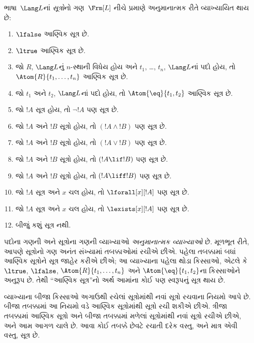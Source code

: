 \begin{defn}[સૂત્રો]
ભાષા~$\Lang L$નાં \emph{સૂત્રો}નો ગણ~$\Frm[L]$ નીચે પ્રમાણે
અનુમાનાત્મક રીતે વ્યાખ્યાયિત થાય છે:
\begin{enumerate}
\item $\lfalse$ આણ્વિક સૂત્ર છે.

\item $\ltrue$ આણ્વિક સૂત્ર છે.

\item જો $R$, $\Lang L$નું $n$-સ્થાની વિધેય હોય અને $t_1$,
  \dots, $t_n$, $\Lang L$નાં પદો હોય, તો
  $\Atom{R}{t_1,\ldots,t_n}$ આણ્વિક સૂત્ર છે.

\item જો $t_1$ અને $t_2$, $\Lang L$નાં પદો હોય, તો
  $\Atom{\eq}{t_1,t_2}$ આણ્વિક સૂત્ર છે.

\item જો $!A$ સૂત્ર હોય, તો $\lnot !A$ પણ
  સૂત્ર છે.

\item જો $!A$ અને $!B$ સૂત્રો હોય, તો $(!A \land
  !B)$ પણ સૂત્ર છે.

\item જો $!A$ અને $!B$ સૂત્રો હોય, તો $(!A \lor !B)$
  પણ સૂત્ર છે.

\item જો $!A$ અને $!B$ સૂત્રો હોય, તો $(!A \lif !B)$
  પણ સૂત્ર છે.

\item જો $!A$ અને $!B$ સૂત્રો હોય, તો $(!A \liff !B)$
  પણ સૂત્ર છે.

\item જો $!A$ સૂત્ર અને $x$ ચલ હોય,
  તો $\lforall[x][!A]$ પણ સૂત્ર છે.

\item જો $!A$ સૂત્ર અને $x$ ચલ હોય,
  તો $\lexists[x][!A]$ પણ સૂત્ર છે.

\item બીજું કશું સૂત્ર નથી.
\end{enumerate}
\end{defn}

\begin{explain}
પદોના ગણની અને સૂત્રોના ગણની વ્યાખ્યાઓ \emph{અનુમાનાત્મક
વ્યાખ્યાઓ} છે. મૂળભૂત રીતે, આપણે સૂત્રોનો ગણ અનંત સંખ્યામાં
તબક્કાઓમાં રચીએ છીએ. પહેલા તબક્કામાં બધાં આણ્વિક સૂત્રોને સૂત્ર જાહેર
કરીએ છીએ; આ વ્યાખ્યાના પહેલા થોડા કિસ્સાઓ, એટલે કે
$\ltrue$, %
$\lfalse$, %
$\Atom{R}{t_1,\dots,t_n}$ અને $\Atom{\eq}{t_1,t_2}$ના કિસ્સાઓને
અનુરૂપ છે. તેથી ``આણ્વિક સૂત્ર''નો અર્થ આમાંના કોઈ પણ સ્વરૂપનું
સૂત્ર થાય છે.

વ્યાખ્યાના બીજા કિસ્સાઓ અગાઉથી રચેલાં સૂત્રોમાંથી નવાં
સૂત્રો રચવાના નિયમો આપે છે. બીજા તબક્કામાં આ નિયમો વડે આણ્વિક
સૂત્રોમાંથી સૂત્રો રચી શકીએ છીએ. ત્રીજા તબક્કામાં આણ્વિક
સૂત્રો અને બીજા તબક્કામાં મળેલાં સૂત્રોમાંથી નવાં સૂત્રો રચીએ છીએ,
અને આમ આગળ ચાલે છે. આવા કોઈ તબક્કે છેવટે રચાતી દરેક વસ્તુ, અને માત્ર
એવી વસ્તુ, સૂત્ર છે.
\end{explain}

